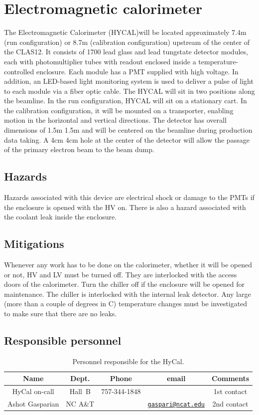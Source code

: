 \section{Electromagnetic calorimeter}

The Electromagnetic Calorimeter (HYCAL)will be located approximately 7.4m (run
configuration) or 8.7m (calibration configuration) upstream of the center of the CLAS12.
It consists of 1700 lead glass and lead tungstate detector modules, each with photomultiplier tubes with readout enclosed inside a temperature-controlled enclosure. Each
module has a PMT supplied with high voltage. In addition, an LED-based light monitoring system is used to deliver a pulse of
light to each module via a fiber optic cable. The HYCAL will sit in two positions along
the beamline. In the run configuration, HYCAL will sit on a stationary cart. In the
calibration configuration, it will be mounted on a transporter, enabling motion in
the horizontal and vertical directions. The detector has overall dimensions of 1.5m 1.5m
and will be centered on the beamline during production data taking. A 4cm 4cm hole
at the center of the detector will allow the passage of the primary electron beam to the
beam dump.  
\subsection{Hazards}
Hazards associated with this device are electrical shock or damage to the PMTs if the enclosure is opened with the HV on. 
There is also a hazard associated with the coolant leak inside the enclosure.
\subsection{Mitigations}
Whenever any work has to be done on the calorimeter, whether it will be opened
or not, HV and LV must be turned off. They are interlocked with the access doors of the calorimeter.
Turn the chiller off if the enclosure will be opened for maintenance. The chiller is interlocked with the internal leak detector.
Any large (more than a couple of degrees in C) temperature changes must be investigated to make
sure that there are no leaks.
\subsection{Responsible personnel}

\begin{table}[!htb]
\centering
\begin{tabular}{|c|c|c|c|c|} \hline
Name&Dept.&Phone&email&Comments \\ \hline
HyCal on-call & Hall~B& 757-344-1848&& 1st contact  \\ \hline
Ashot Gasparian & NC A\&T  & &\href{mailto:gaspari@ncat.edu}{\nolinkurl{gaspari@ncat.edu}}  &2nd contact \\ \hline
 \end{tabular}
\caption{Personnel responsible for the HyCal.} 
\label{tb:vacuum}
\end{table}



